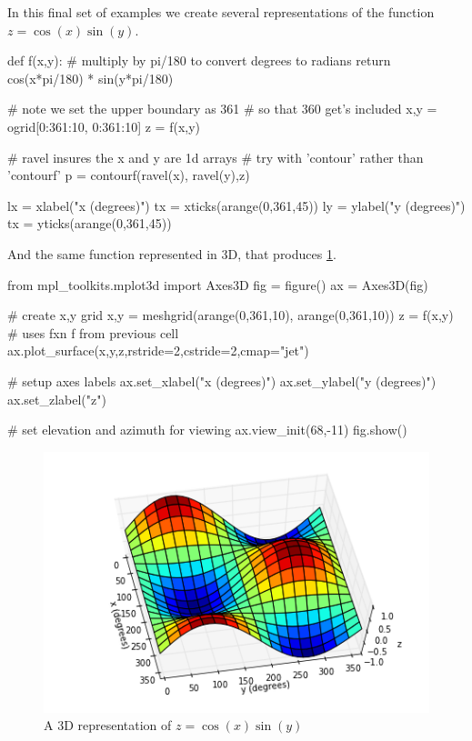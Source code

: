 In this final set of examples we create several representations of the function $z = \cos(x) \sin(y)$.
%
\begin{python}
def f(x,y):
    # multiply by pi/180 to convert degrees to radians
    return cos(x*pi/180) * sin(y*pi/180)

# note we set the upper boundary as 361
# so that 360 get's included
x,y = ogrid[0:361:10, 0:361:10]
z = f(x,y)

# ravel insures the x and y are 1d arrays
# try with 'contour' rather than 'contourf'
p = contourf(ravel(x), ravel(y),z)

lx = xlabel("x (degrees)")
tx = xticks(arange(0,361,45))
ly = ylabel("y (degrees)")
tx = yticks(arange(0,361,45))
\end{python}
%
And the same function represented in 3D, that produces \cref{fig:3dplot}.
%
\begin{python}
from mpl_toolkits.mplot3d import Axes3D
fig = figure()
ax = Axes3D(fig)

# create x,y grid
x,y = meshgrid(arange(0,361,10), arange(0,361,10))
z = f(x,y) # uses fxn f from previous cell
ax.plot_surface(x,y,z,rstride=2,cstride=2,cmap="jet")

# setup axes labels
ax.set_xlabel("x (degrees)")
ax.set_ylabel("y (degrees)")
ax.set_zlabel("z")

# set elevation and azimuth for viewing
ax.view_init(68,-11) 
fig.show()
\end{python}
%
\begin{figure}[!ht]
    \centering
    \includegraphics[width=0.5\columnwidth]{./figures/hands-on8/fig-3dplot.png}
    \caption{A 3D representation of $z = \cos(x) \sin(y)$}\label{fig:3dplot}
\end{figure}



